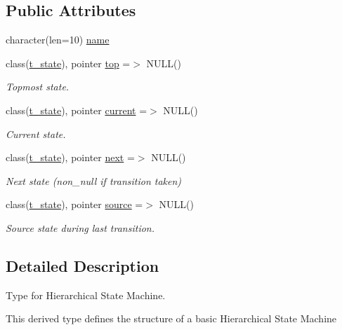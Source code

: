 \subsection*{Public Attributes}
\begin{DoxyCompactItemize}
\item 
character(len=10) \hyperlink{structmo__hsm__class_1_1t__hsm_a41c6532ae5a0ad64e3859551d680e304}{name}
\item 
class(\hyperlink{structmo__hsm__class_1_1t__state}{t\+\_\+state}), pointer \hyperlink{structmo__hsm__class_1_1t__hsm_ac82b92ceb5581d9541a803ce0f618513}{top} =$>$ N\+U\+L\+L()
\begin{DoxyCompactList}\small\item\em Topmost state. \end{DoxyCompactList}\item 
class(\hyperlink{structmo__hsm__class_1_1t__state}{t\+\_\+state}), pointer \hyperlink{structmo__hsm__class_1_1t__hsm_aa44c8241f08804bcb0735ad94de011aa}{current} =$>$ N\+U\+L\+L()
\begin{DoxyCompactList}\small\item\em Current state. \end{DoxyCompactList}\item 
class(\hyperlink{structmo__hsm__class_1_1t__state}{t\+\_\+state}), pointer \hyperlink{structmo__hsm__class_1_1t__hsm_a2c0b1b670fbc0073efab59f8257f4486}{next} =$>$ N\+U\+L\+L()
\begin{DoxyCompactList}\small\item\em Next state (non\+\_\+null if transition taken) \end{DoxyCompactList}\item 
class(\hyperlink{structmo__hsm__class_1_1t__state}{t\+\_\+state}), pointer \hyperlink{structmo__hsm__class_1_1t__hsm_ac172a34a2cef6a45250c897f8c165e67}{source} =$>$ N\+U\+L\+L()
\begin{DoxyCompactList}\small\item\em Source state during last transition. \end{DoxyCompactList}\end{DoxyCompactItemize}


\subsection{Detailed Description}
Type for Hierarchical State Machine. 

This derived type defines the structure of a basic Hierarchical State Machine 

